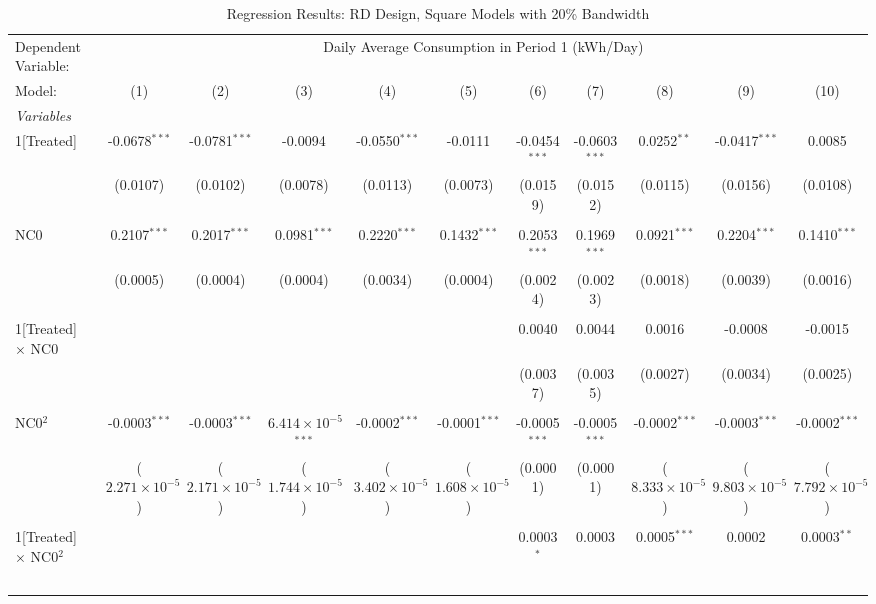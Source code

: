 \begin{table}[htbp]
\centering
\caption{\label{Table:Regression-Results_RD_Square_BW-20} Regression Results: RD Design, Square Models with 20\% Bandwidth}
\begin{adjustbox}{scale = 0.6}
\begin{tabular}{lcccccccccc}
\tabularnewline\toprule\toprule
Dependent Variable:&\multicolumn{10}{c}{Daily Average Consumption in Period 1 (kWh/Day)}\\
Model:&(1) & (2) & (3) & (4) & (5) & (6) & (7) & (8) & (9) & (10)\\
\midrule
\emph{Variables}&   &   &   &   &   &   &   &   &   &  \\
1[Treated]&-0.0678$^{***}$ & -0.0781$^{***}$ & -0.0094 & -0.0550$^{***}$ & -0.0111 & -0.0454$^{***}$ & -0.0603$^{***}$ & 0.0252$^{**}$ & -0.0417$^{***}$ & 0.0085\\
  &(0.0107) & (0.0102) & (0.0078) & (0.0113) & (0.0073) & (0.0159) & (0.0152) & (0.0115) & (0.0156) & (0.0108)\\
&   &   &   &   &   &   &   &   &   &  \\
NC0&0.2107$^{***}$ & 0.2017$^{***}$ & 0.0981$^{***}$ & 0.2220$^{***}$ & 0.1432$^{***}$ & 0.2053$^{***}$ & 0.1969$^{***}$ & 0.0921$^{***}$ & 0.2204$^{***}$ & 0.1410$^{***}$\\
  &(0.0005) & (0.0004) & (0.0004) & (0.0034) & (0.0004) & (0.0024) & (0.0023) & (0.0018) & (0.0039) & (0.0016)\\
&   &   &   &   &   &   &   &   &   &  \\
1[Treated] $\times $ NC0&   &    &    &    &    & 0.0040 & 0.0044 & 0.0016 & -0.0008 & -0.0015\\
  &   &    &    &    &    & (0.0037) & (0.0035) & (0.0027) & (0.0034) & (0.0025)\\
&   &   &   &   &   &   &   &   &   &  \\
NC0$^2$&-0.0003$^{***}$ & -0.0003$^{***}$ & $6.414\times 10^{-5}$$^{***}$ & -0.0002$^{***}$ & -0.0001$^{***}$ & -0.0005$^{***}$ & -0.0005$^{***}$ & -0.0002$^{***}$ & -0.0003$^{***}$ & -0.0002$^{***}$\\
  &($2.271\times 10^{-5}$) & ($2.171\times 10^{-5}$) & ($1.744\times 10^{-5}$) & ($3.402\times 10^{-5}$) & ($1.608\times 10^{-5}$) & (0.0001) & (0.0001) & ($8.333\times 10^{-5}$) & ($9.803\times 10^{-5}$) & ($7.792\times 10^{-5}$)\\
&   &   &   &   &   &   &   &   &   &  \\
1[Treated] $\times $ NC0$^2$&   &    &    &    &    & 0.0003$^{*}$ & 0.0003 & 0.0005$^{***}$ & 0.0002 & 0.0003$^{**}$\\
$$
\end{tabular}
\end{adjustbox}
\end{table}
